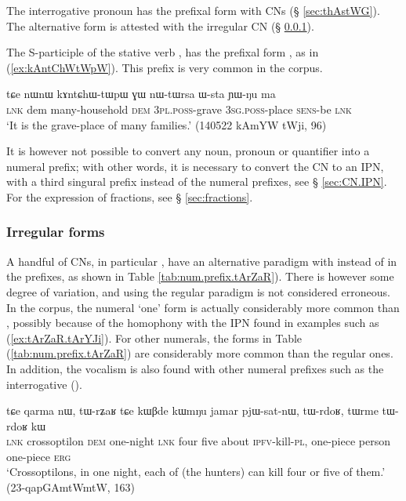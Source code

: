 The interrogative pronoun  has the prefixal form  with CNs (§  \ref{sec:thAstWG}). The alternative form  is attested with the irregular  CN  (§ \ref{sec:irregular.numeral.prefixes}).

The S-participle   of the stative verb ,  has the prefixal form , as in (\ref{ex:kAntChWtWpW}). This prefix is very common in the corpus.

\begin{exe}
\ex \label{ex:kAntChWtWpW}
 \gll  tɕe nɯnɯ kɤntɕhɯ-tɯpɯ ɣɯ nɯ-tɯrsa ɯ-sta ɲɯ-ŋu ma \\
 \textsc{lnk} dem many-household \textsc{dem} \textsc{3pl}.\textsc{poss}-grave \textsc{3sg}.\textsc{poss}-place \textsc{sens}-be \textsc{lnk} \\
 \glt `It is the grave-place of many families.' (140522 kAmYW tWji, 96)
\end{exe}

It is however not possible to convert any noun, pronoun or quantifier into a numeral prefix; with other words, it is necessary to convert the CN to an IPN, with a third singural  prefix instead of the numeral prefixes, see § \ref{sec:CN.IPN}. For the expression of fractions, see § \ref{sec:fractions}.

\subsubsection{Irregular forms} \label{sec:irregular.numeral.prefixes}
A handful of CNs, in particular , have an alternative paradigm with  instead of  in the prefixes, as shown in Table \ref{tab:num.prefix.tArZaR}). There is however some degree of variation, and using the regular paradigm is not considered erroneous. In the corpus, the numeral `one' form  is actually considerably more common than , possibly because of the homophony with the IPN  found in examples such as (\ref{ex:tArZaR.tArYJi}). For other numerals, the forms in Table (\ref{tab:num.prefix.tArZaR}) are considerably more common than the regular ones. In addition, the  vocalism is also found with other numeral prefixes such as the interrogative ().

\begin{exe}
\ex \label{ex:tWrZaR}
\gll tɕe qarma nɯ, tɯ-rʑaʁ tɕe kɯβde kɯmŋu jamar pjɯ-sat-nɯ, tɯ-rdoʁ, tɯrme tɯ-rdoʁ kɯ \\
\textsc{lnk} crossoptilon \textsc{dem} one-night \textsc{lnk} four five about \textsc{ipfv}-kill-\textsc{pl}, one-piece person one-piece \textsc{erg} \\
\glt `Crossoptilons, in one night, each of (the hunters) can kill four or five of them.' (23-qapGAmtWmtW, 163)
\end{exe}

